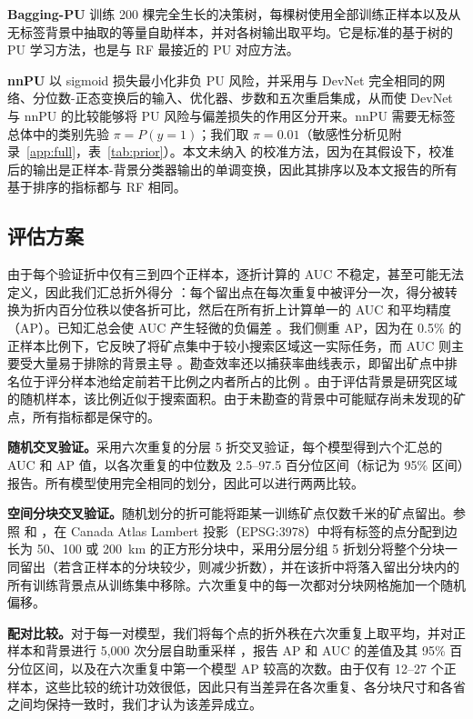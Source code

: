 \documentclass[pdflatex,sn-apa]{sn-jnl}
\begin{document}
\textbf{Bagging-PU} \citep{Mordelet2014} 训练 200 棵完全生长的决策树，每棵树使用全部训练正样本以及从无标签背景中抽取的等量自助样本，并对各树输出取平均。它是标准的基于树的 PU 学习方法，也是与 RF 最接近的 PU 对应方法。

\textbf{nnPU} \citep{Kiryo2017} 以 sigmoid 损失最小化非负 PU 风险，并采用与 DevNet 完全相同的网络、分位数-正态变换后的输入、优化器、步数和五次重启集成，从而使 DevNet 与 nnPU 的比较能够将 PU 风险与偏差损失的作用区分开来。nnPU 需要无标签总体中的类别先验 $\pi = P(y=1)$；我们取 $\pi = 0.01$（敏感性分析见附录~\ref{app:full}，表~\ref{tab:prior}）。本文未纳入 \citet{Elkan2008} 的校准方法，因为在其假设下，校准后的输出是正样本-背景分类器输出的单调变换，因此其排序以及本文报告的所有基于排序的指标都与 RF 相同。

\subsection{评估方案}\label{sec:protocol}

由于每个验证折中仅有三到四个正样本，逐折计算的 AUC 不稳定，甚至可能无法定义，因此我们汇总折外得分 \citep{BradleyAP1997}：每个留出点在每次重复中被评分一次，得分被转换为折内百分位秩以使各折可比，然后在所有折上计算单一的 AUC 和平均精度（AP）。已知汇总会使 AUC 产生轻微的负偏差 \citep{Airola2019,Parker2007}。我们侧重 AP，因为在 0.5\% 的正样本比例下，它反映了将矿点集中于较小搜索区域这一实际任务，而 AUC 则主要受大量易于排除的背景主导 \citep{Saito2015}。勘查效率还以捕获率曲线表示，即留出矿点中排名位于评分样本池给定前若干比例之内者所占的比例 \citep{Chung2003,Agterberg2005}。由于评估背景是研究区域的随机样本，该比例近似于搜索面积。由于未勘查的背景中可能赋存尚未发现的矿点，所有指标都是保守的。

\textbf{随机交叉验证。}采用六次重复的分层 5 折交叉验证，每个模型得到六个汇总的 AUC 和 AP 值，以各次重复的中位数及 2.5--97.5 百分位区间（标记为 95\% 区间）报告。所有模型使用完全相同的划分，因此可以进行两两比较。

\textbf{空间分块交叉验证。}随机划分的折可能将距某一训练矿点仅数千米的矿点留出。参照 \citet{Roberts2017} 和 \citet{Valavi2019}，在 Canada Atlas Lambert 投影（EPSG:3978）中将有标签的点分配到边长为 50、100 或 200~km 的正方形分块中，采用分层分组 5 折划分将整个分块一同留出（若含正样本的分块较少，则减少折数），并在该折中将落入留出分块内的所有训练背景点从训练集中移除。六次重复中的每一次都对分块网格施加一个随机偏移。

\textbf{配对比较。}对于每一对模型，我们将每个点的折外秩在六次重复上取平均，并对正样本和背景进行 5,000 次分层自助重采样 \citep{Efron1993}，报告 AP 和 AUC 的差值及其 95\% 百分位区间，以及在六次重复中第一个模型 AP 较高的次数。由于仅有 12--27 个正样本，这些比较的统计功效很低，因此只有当差异在各次重复、各分块尺寸和各省之间均保持一致时，我们才认为该差异成立。
\end{document}
